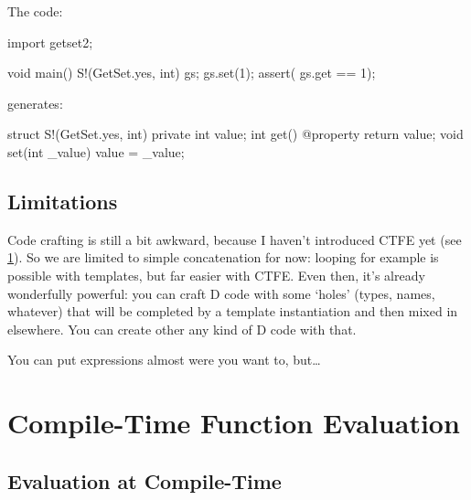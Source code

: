The code:

\begin{dcode}
import getset2;

void main()
{
    S!(GetSet.yes, int) gs;
    gs.set(1);
    assert( gs.get == 1);
}
\end{dcode}

generates:

\begin{dcode}
struct S!(GetSet.yes, int)
{
    private int value;
    int get() @property { return value;}
    void set(int _value) { value = _value;}
}
\end{dcode}

\subsection{Limitations}\label{stringmixinslimitations}

Code crafting is still a bit awkward, because I haven't introduced CTFE yet (see \ref{ctfe}). So we are limited to simple concatenation for now: looping for example is possible with templates, but far easier with CTFE. Even then, it's already wonderfully powerful: you can craft D code with some `holes' (types, names, whatever) that will be completed by a template instantiation and then mixed in elsewhere. You can create other any kind of D code with that.

You can put \DD{()} expressions almost were you want to, but\ldots




\section{Compile-Time Function Evaluation} \label{ctfe}

\subsection{Evaluation at Compile-Time} \label{compiletimeevaluation}


